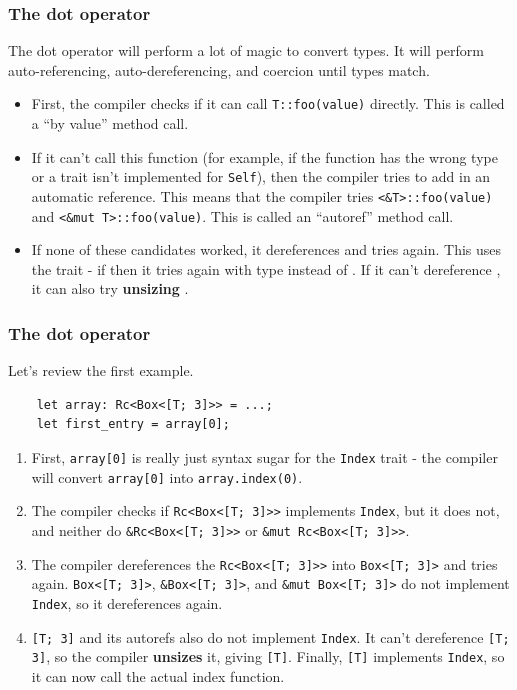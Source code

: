 \documentclass[aspectratio=1610,t]{beamer}
\begin{document}

\begin{frame}[fragile]
\frametitle{The dot operator}
The dot operator will perform a lot of magic to convert types. It will perform auto-referencing, auto-dereferencing, and coercion until types match.

\begin{itemize}
    \item<2-> First, the compiler checks if it can call \texttt{T::foo(value)} directly. This is called a ``by value'' method call.
    \item<3-> If it can't call this function (for example, if the function has the wrong type or a trait isn't implemented for \texttt{Self}), then the compiler tries to add in an automatic reference. This means that the compiler tries \texttt{<\&T>::foo(value)} and \texttt{<\&mut T>::foo(value)}. This is called an ``autoref'' method call.
    \item<4-> If none of these candidates worked, it dereferences  and tries again. This uses the  trait - if  then it tries again with type  instead of . If it can't dereference , it can also try \textbf{unsizing} .
\end{itemize}
\end{frame}


\begin{frame}[fragile]
\frametitle{The dot operator}
Let's review the first example.

\begin{verbatim}
    let array: Rc<Box<[T; 3]>> = ...;
    let first_entry = array[0];
\end{verbatim}

\begin{enumerate}
    \item<2-> First, \texttt{array[0]} is really just syntax sugar for the \texttt{Index} trait - the compiler will convert \texttt{array[0]} into \texttt{array.index(0)}.
    \item<3-> The compiler checks if \texttt{Rc<Box<[T; 3]>>} implements \texttt{Index}, but it does not, and neither do \texttt{\&Rc<Box<[T; 3]>>} or \texttt{\&mut Rc<Box<[T; 3]>>}.
    \item<4-> The compiler dereferences the \texttt{Rc<Box<[T; 3]>>} into \texttt{Box<[T; 3]>} and tries again. \texttt{Box<[T; 3]>}, \texttt{\&Box<[T; 3]>}, and \texttt{\&mut Box<[T; 3]>} do not implement \texttt{Index}, so it dereferences again.
    \item<5-> \texttt{[T; 3]} and its autorefs also do not implement \texttt{Index}. It can't dereference \texttt{[T; 3]}, so the compiler \textbf{unsizes} it, giving \texttt{[T]}. Finally, \texttt{[T]} implements \texttt{Index}, so it can now call the actual index function.
\end{enumerate}
\end{frame}
\end{document}
